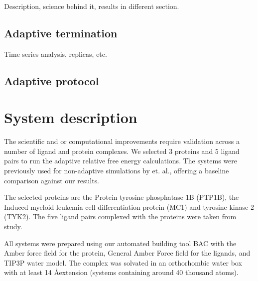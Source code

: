 Description, science behind it, results in different section.

\subsection{Adaptive termination}

Time series analysis, replicas, etc.

\subsection{Adaptive protocol}

\section{System description}

The scientific and or computational improvements require validation across a number of ligand and protein complexes. We selected 3 proteins and 5 ligand pairs to run the adaptive relative free energy calculations. The systems were previously used for non-adaptive simulations by \cite{} et. al., offering a baseline comparison against our results. 

The selected proteins are the Protein tyrosine phosphatase 1B (PTP1B), the Induced myeloid leukemia cell differentiation protein (MC1) and tyrosine kinase 2 (TYK2). The five ligand pairs complexed with the proteins were taken from \cite{} study.

All systems were prepared using our automated building tool BAC \cite{} with the Amber force field for the protein, General Amber Force field for the ligands, and TIP3P water model. The complex was solvated in an orthorhombic water box with at least 14 \AA extension (systems containing around 40 thousand atoms).  

 
